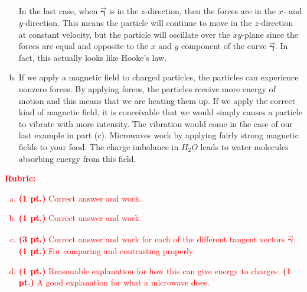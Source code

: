\documentclass[12pt]{article} %
\newcommand{\curvegamma}{\boldsymbol{\vec{\gamma}}}
\newcommand{\tangentgamma}{\boldsymbol{\dot{\vec{\gamma}}}}
\begin{document}
\begin{solution}
\begin{enumerate}[(a)]
	In the last case, when $\tangentgamma$ is in the $z$-direction, then the forces are in the $x$- and $y$-direction. This means the particle will continue to move in the $z$-direction at constant velocity, but the particle will oscillate over the $xy$-plane since the forces are equal and opposite to the $x$ and $y$ component of the curve $\curvegamma$. In fact, this actually looks like Hooke's law.

    \item If we apply a magnetic field to charged particles, the particles can experience nonzero forces. By applying forces, the particles receive more energy of motion and this means that we are heating them up.  If we apply the correct kind of magnetic field, it is conceivable that we would simply causes a particle to vibrate with more intensity. The vibration would come in the case of our last example in part (c). Microwaves work by applying fairly strong magnetic fields to your food. The charge imbalance in $H_2 O$ leads to water molecules absorbing energy from this field.
\end{enumerate}
\end{solution}
\vspace*{1cm}
\textcolor{red}{
\noindent \textbf{Rubric:}
\begin{enumerate}[(a)]
    \item \textbf{(1 pt.)} Correct answer and work.
	\item \textbf{(1 pt.)} Correct answer and work.
	\item \textbf{(3 pt.)} Correct answer and work for each of the different tangent vectors $\tangentgamma$. \textbf{(1 pt.)} For comparing and contrasting properly.
	\item \textbf{(1 pt.)} Reasonable explanation for how this can give energy to charges. \textbf{(1 pt.)} A good explanation for what a microwave does. 
\end{enumerate}
}

\newpage
\end{document}

